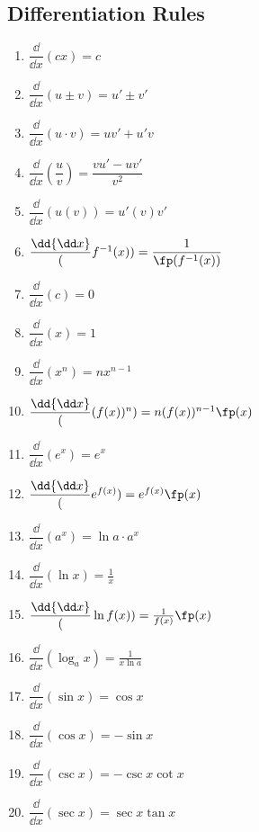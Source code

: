 

\subsection{Differentiation Rules}

\bgroup
\footnotesize
\renewcommand{\arraystretch}{2.5}%
\setlength{\columnsep}{6pt}%
\noindent{}%
\hspace{-1.5em}%
\parbox{.29\linewidth}{%
\begin{enumerate}
\item $\dfrac\dd{\dd x}(cx)=c$
\item $\dfrac\dd{\dd x}(u\pm v)=u'\pm v'$
\item $\dfrac\dd{\dd x}(u\cdot v)=uv'+u'v$%
\item $\dfrac\dd{\dd x}\left(\dfrac uv\right)=\dfrac{vu'-uv'}{v^2}$
\item $\dfrac\dd{\dd x}(u(v))=u'(v)v'$
\item $\dfrac\dd{\dd x}(f^{-1}(x))=\dfrac1{\fp(f^{-1}(x))}$
\item $\dfrac\dd{\dd x}(c)=0$
\item $\dfrac\dd{\dd x}(x)=1$
\item $\dfrac\dd{\dd x}(x^n)=nx^{n-1}$
\item $\dfrac\dd{\dd x}((f(x))^n)=n(f(x))^{n-1}\fp(x)$
\end{enumerate}}\hfill
\parbox{.23\linewidth}{%
\begin{enumerate}\setcounter{enumi}{10}
\item $\dfrac\dd{\dd x}(e^x)=e^x$
\item $\dfrac\dd{\dd x}(e^{f(x)})=e^{f(x)}\fp(x)$
\item $\dfrac\dd{\dd x}(a^x)=\ln a\cdot a^x$
\item $\dfrac\dd{\dd x}(\ln x)=\frac1x$
\item $\dfrac\dd{\dd x}(\ln f(x))=\frac1{f(x)}\fp(x)$
\item $\dfrac\dd{\dd x}(\log_a x)=\frac1{x\ln a}$
\item $\dfrac\dd{\dd x}(\sin x)=\cos x$
\item $\dfrac\dd{\dd x}(\cos x)=-\sin x$
\item $\dfrac\dd{\dd x}(\csc x)=-\csc x\cot x$%
\item $\dfrac\dd{\dd x}(\sec x)=\sec x\tan x$
\end{enumerate}}\hfill
